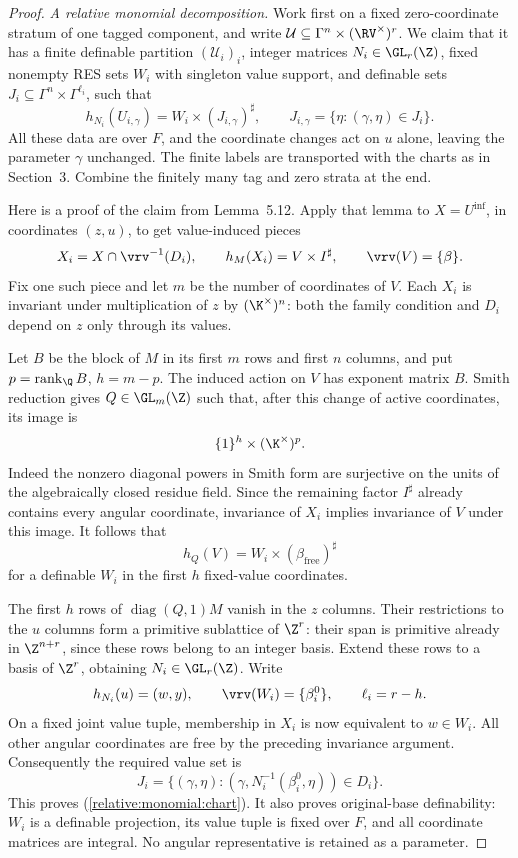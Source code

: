 \begin{proof}
\emph{A relative monomial decomposition.}
Work first on a fixed zero-coordinate stratum of one tagged
component, and write
$\mathcal U\subseteq\Gamma^n\times(\RV^\times)^r$.
We claim that it has a finite definable partition
$(\mathcal U_i)_i$, integer matrices $N_i\in\GL_r(\Z)$,
fixed nonempty RES sets $W_i$ with singleton value support,
and definable sets
$J_i\subseteq\Gamma^n\times\Gamma^{\ell_i}$, such that
\begin{equation}\label{relative:monomial:chart}
 h_{N_i}(U_{i,\gamma})
       =W_i\times(J_{i,\gamma})^\sharp,\qquad
 J_{i,\gamma}=\{\eta:(\gamma,\eta)\in J_i\}.
\end{equation}
All these data are over $F$, and the coordinate changes act on
$u$ alone, leaving the parameter $\gamma$ unchanged.
The finite labels are transported with the charts as in
Section~3. Combine the finitely many tag and zero strata at
the end.

Here is a proof of the claim from Lemma~5.12.
Apply that lemma to $X=U^{\mathrm{inf}}$, in coordinates
$(z,u)$, to get value-induced pieces
\[
 X_i=X\cap\vrv^{-1}(D_i),\qquad
 h_M(X_i)=V\times I^\sharp,\qquad \vrv(V)=\{\beta\}.
\]
Fix one such piece and let $m$ be the number of coordinates of
$V$. Each $X_i$ is invariant under multiplication of $z$ by
$(\K^\times)^n$: both the family condition and $D_i$
depend on $z$ only through its values.

Let $B$ be the block of $M$ in its first $m$ rows and first
$n$ columns, and put $p=\operatorname{rank}_{\Q}B$,
$h=m-p$. The induced action on $V$ has exponent matrix $B$.
Smith reduction gives $Q\in\GL_m(\Z)$ such that, after this
change of active coordinates, its image is
\[
 \{1\}^h\times(\K^\times)^p.
\]
Indeed the nonzero diagonal powers in Smith form are
surjective on the units of the algebraically closed residue
field. Since the remaining factor $I^\sharp$ already contains
every angular coordinate, invariance of $X_i$ implies
invariance of $V$ under this image. It follows that
\[
 h_Q(V)=W_i\times(\beta_{\mathrm{free}})^\sharp
\]
for a definable $W_i$ in the first $h$ fixed-value
coordinates.

The first $h$ rows of $\operatorname{diag}(Q,1)M$ vanish in
the $z$ columns. Their restrictions to the $u$ columns form
a primitive sublattice of $\Z^r$: their span is primitive
already in $\Z^{n+r}$, since these rows belong to an integer
basis. Extend these rows to a basis of $\Z^r$, obtaining
$N_i\in\GL_r(\Z)$. Write
\[
 h_{N_i}(u)=(w,y),\qquad
 \vrv(W_i)=\{\beta_i^0\},\qquad \ell_i=r-h.
\]
On a fixed joint value tuple, membership in $X_i$ is now
equivalent to $w\in W_i$. All other angular coordinates
are free by the preceding invariance argument.
Consequently the required value set is
\[
 J_i=\{(\gamma,\eta):
       (\gamma,N_i^{-1}(\beta_i^0,\eta))\in D_i\}.
\]
This proves (\ref{relative:monomial:chart}).
It also proves original-base definability: $W_i$ is a
definable projection, its value tuple is fixed over $F$,
and all coordinate matrices are integral. No angular
representative is retained as a parameter.


\end{proof}
